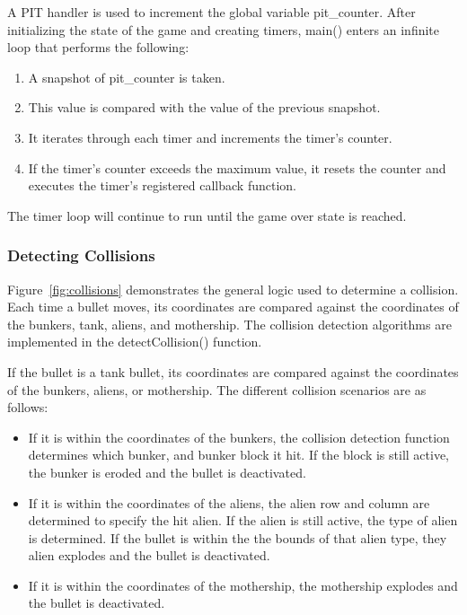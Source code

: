 \documentclass[11pt,letter,oneside]{report}
\begin{document}
A PIT handler is used to increment the global variable pit\_counter.  After initializing the state of the game and creating timers, main() enters an infinite loop that performs the following:
\begin{enumerate}
\item{} A snapshot of pit\_counter is taken.  
\item{} This value is compared with the value of the previous snapshot.
\item{} It iterates through each timer and increments the timer's counter.
\item{} If the timer's counter exceeds the maximum value, it resets the counter and executes the timer's registered callback function.
\end{enumerate}

The timer loop will continue to run until the game over state is reached.

\subsubsection{Detecting Collisions}
Figure~\ref{fig:collisions} demonstrates the general logic used to determine a collision. Each time a bullet moves, its coordinates are compared against the coordinates of the bunkers, tank, aliens, and mothership. The collision detection algorithms are implemented in the detectCollision() function.
 
If the bullet is a tank bullet, its coordinates are compared against the coordinates of the bunkers, aliens, or mothership. The different collision scenarios are as follows:

\begin{itemize}
\item If it is within the coordinates of the bunkers, the collision detection function determines which bunker, and bunker block it hit. If the block is still active, the bunker is eroded and the bullet is deactivated.
\item If it is within the coordinates of the aliens, the alien row and column are determined to specify the hit alien. If the alien is still active, the type of alien is determined. If the bullet is within the the bounds of that alien type, they alien explodes and the bullet is deactivated.
\item If it is within the coordinates of the mothership, the mothership explodes and the bullet is deactivated.
\end{itemize}
\end{document}

